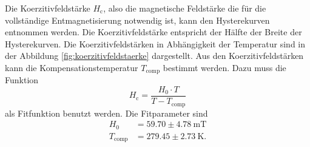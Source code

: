 Die Koerzitivfeldstärke $H_\mathrm{c}$, also die magnetische Feldstärke die für die vollständige Entmagnetisierung notwendig ist, kann den Hysterekurven entnommen werden. 
Die Koerzitivfeldstärke entspricht der Hälfte der Breite der Hysterekurven. 
Die Koerzitivfeldstärken in Abhängigkeit der Temperatur sind in der Abbildung \ref{fig:koerzitivfeldstaerke} dargestellt. 
Aus den Koerzitivfeldstärken kann die Kompensationstemperatur $T_\mathrm{comp}$ bestimmt  
werden.
Dazu muss die Funktion  
\begin{equation}
H_\mathrm{c} = \frac{H_0 \cdot T}{T-T_\mathrm{comp}}
\label{eq:koerzitivfeldstaerke} 
\end{equation}
als Fitfunktion benutzt werden.
Die Fitparameter sind
\begin{align}
H_0 & = 59.70 \pm 4.78\ \mathrm{mT}\\
T_\mathrm{comp} & = 279.45 \pm 2.73\ \mathrm{K} .
\label{eq:fitwerte}
\end{align}

 
